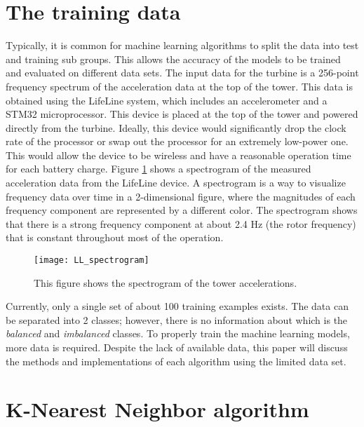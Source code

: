 \section{The training data}
Typically, it is common for machine learning algorithms to split the data into test and training sub groups.  This allows the accuracy of the models to be trained and evaluated on different data sets.  The input data for the turbine is a 256-point frequency spectrum of the acceleration data at the top of the tower.  This data is obtained using the LifeLine system, which includes an accelerometer and a STM32 microprocessor.  This device is placed at the top of the tower and powered directly from the turbine.  Ideally, this device would significantly drop the clock rate of the processor or swap out the processor for an extremely low-power one.  This would allow the device to be wireless and have a reasonable operation time for each battery charge.  Figure \ref{fig:LL_spectrogram} shows a spectrogram of the measured acceleration data from the LifeLine device.  A spectrogram is a way to visualize frequency data over time in a 2-dimensional figure, where the magnitudes of each frequency component are represented by a different color.  The spectrogram shows that there is a strong frequency component at about 2.4 Hz (the rotor frequency) that is constant throughout most of the operation.

\begin{figure}
	\centering
	\texttt{[image: LL\_spectrogram]}
	\decoRule
	\caption{This figure shows the spectrogram of the tower accelerations.}
	\label{fig:LL_spectrogram}
\end{figure}

Currently, only a single set of about 100 training examples exists.  The data can be separated into 2 classes; however, there is no information about which is the \textit{balanced} and \textit{imbalanced} classes.  To properly train the machine learning models, more data is required.  Despite the lack of available data, this paper will discuss the methods and implementations of each algorithm using the limited data set.


\section{K-Nearest Neighbor algorithm}
